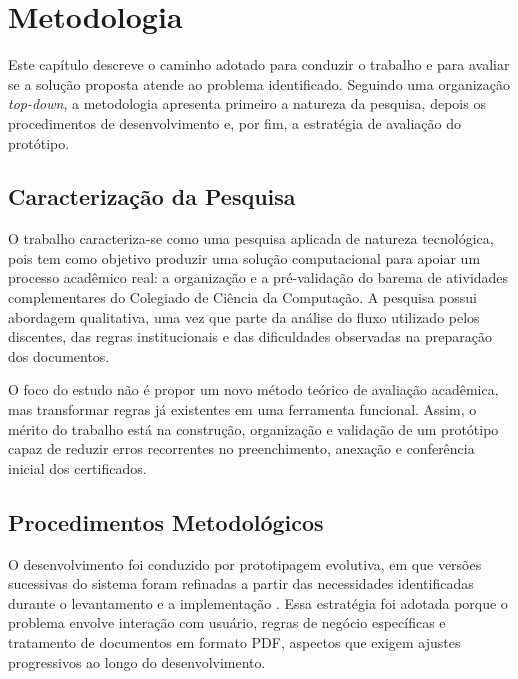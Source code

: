 \chapter{Metodologia}
\label{cap:metodologia}

Este capítulo descreve o caminho adotado para conduzir o trabalho e para avaliar se a solução proposta atende ao problema identificado. Seguindo uma organização \textit{top-down}, a metodologia apresenta primeiro a natureza da pesquisa, depois os procedimentos de desenvolvimento e, por fim, a estratégia de avaliação do protótipo.

\section{Caracterização da Pesquisa}





O trabalho caracteriza-se como uma pesquisa aplicada de natureza tecnológica, pois tem como objetivo produzir uma solução computacional para apoiar um processo acadêmico real: a organização e a pré-validação do barema de atividades complementares do Colegiado de Ciência da Computação. A pesquisa possui abordagem qualitativa, uma vez que parte da análise do fluxo utilizado pelos discentes, das regras institucionais e das dificuldades observadas na preparação dos documentos.

O foco do estudo não é propor um novo método teórico de avaliação acadêmica, mas transformar regras já existentes em uma ferramenta funcional. Assim, o mérito do trabalho está na construção, organização e validação de um protótipo capaz de reduzir erros recorrentes no preenchimento, anexação e conferência inicial dos certificados.

\section{Procedimentos Metodológicos}

O desenvolvimento foi conduzido por prototipagem evolutiva, em que versões sucessivas do sistema foram refinadas a partir das necessidades identificadas durante o levantamento e a implementação \cite{soareseresende2007}. Essa estratégia foi adotada porque o problema envolve interação com usuário, regras de negócio específicas e tratamento de documentos em formato PDF, aspectos que exigem ajustes progressivos ao longo do desenvolvimento.

